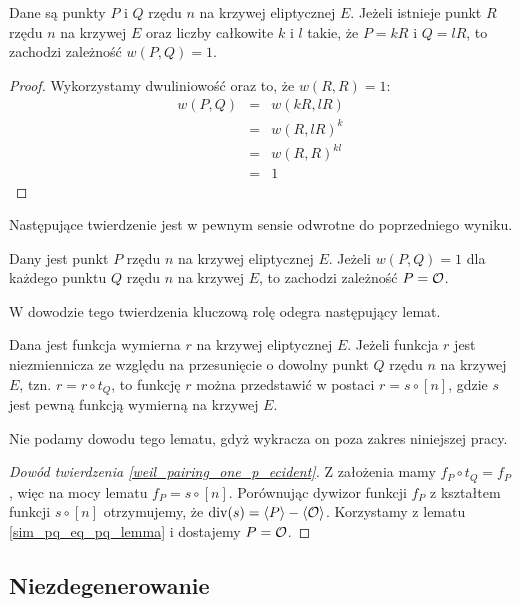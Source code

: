 \begin{theorem}
Dane są punkty $P$ i $Q$ rzędu $n$ na krzywej eliptycznej $E$.
Jeżeli istnieje punkt $R$ rzędu $n$ na krzywej $E$
oraz liczby całkowite $k$ i $l$
takie, że $P = kR$ i $Q = lR$,
to zachodzi zależność $w(P, Q) = 1$.
\end{theorem}

\begin{proof}
Wykorzystamy dwuliniowość oraz to, że $w(R, R) = 1$:
\begin{eqnarray*}
w(P, Q)
& = & w(kR, lR) \\
& = & w(R, lR)^k \\
& = & w(R, R)^{kl} \\
& = & 1
\end{eqnarray*}
\end{proof}

\noindent
Następujące twierdzenie jest w pewnym sensie odwrotne do poprzedniego wyniku.

\begin{theorem}\label{weil_pairing_one_p_ecident}
Dany jest punkt $P$ rzędu $n$ na krzywej eliptycznej $E$.
Jeżeli $w(P, Q) = 1$ dla każdego punktu $Q$ rzędu $n$ na krzywej $E$,
to zachodzi zależność $P = \mathcal{O}$.
\end{theorem}

\noindent
W dowodzie tego twierdzenia kluczową rolę odegra następujący lemat.

\begin{lemma}
Dana jest funkcja wymierna $r$ na krzywej eliptycznej $E$.
Jeżeli funkcja $r$ jest niezmiennicza ze względu na przesunięcie
o dowolny punkt $Q$ rzędu $n$ na krzywej $E$, tzn. $r = r \circ t_Q$,
to funkcję $r$ można przedstawić w postaci $r = s \circ [n]$,
gdzie $s$ jest pewną funkcją wymierną na krzywej $E$.
\end{lemma}

\noindent
Nie podamy dowodu tego lematu, gdyż wykracza on poza zakres niniejszej pracy.

\begin{proof}[Dowód twierdzenia \ref{weil_pairing_one_p_ecident}]
Z założenia mamy $f_P \circ t_Q = f_P$,
więc na mocy lematu $f_P = s \circ [n]$.
Porównując dywizor funkcji $f_P$ z kształtem funkcji $s \circ [n]$
otrzymujemy, że $\operatorname{div}(s) = \left\langle P\right\rangle - \left\langle\mathcal{O}\right\rangle$.
Korzystamy z lematu \ref{sim_pq_eq_pq_lemma} i dostajemy $P = \mathcal{O}$.
\end{proof}

\subsection*{Niezdegenerowanie}

